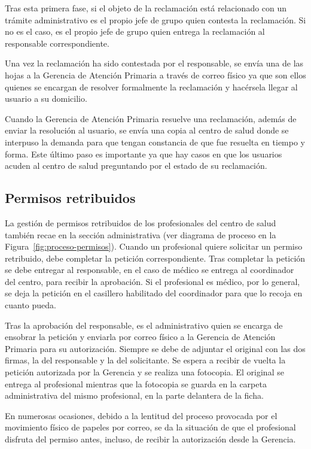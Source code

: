 Tras esta primera fase, si el objeto de la reclamación está relacionado con un trámite administrativo es el propio jefe de grupo quien contesta la reclamación.
Si no es el caso, es el propio jefe de grupo quien entrega la reclamación al responsable correspondiente.

Una vez la reclamación ha sido contestada por el responsable, se envía una de las hojas a la Gerencia de Atención Primaria a través de correo físico ya que son ellos quienes se encargan de resolver formalmente la reclamación y hacérsela llegar al usuario a su domicilio.

Cuando la Gerencia de Atención Primaria resuelve una reclamación, además de enviar la resolución al usuario, se envía una copia al centro de salud donde se interpuso la demanda para que tengan constancia de que fue resuelta en tiempo y forma.
Este último paso es importante ya que hay casos en que los usuarios acuden al centro de salud preguntando por el estado de su reclamación.

\subsection{Permisos retribuidos}

La gestión de permisos retribuidos de los profesionales del centro de salud también recae en la sección administrativa (ver diagrama de proceso en la Figura~\ref{fig:proceso-permisos}).
Cuando un profesional quiere solicitar un permiso retribuido, debe completar la petición correspondiente.
Tras completar la petición se debe entregar al responsable, en el caso de médico se entrega al coordinador del centro, para recibir la aprobación.
Si el profesional es médico, por lo general, se deja la petición en el casillero habilitado del coordinador para que lo recoja en cuanto pueda.

Tras la aprobación del responsable, es el administrativo quien se encarga de ensobrar la petición y enviarla por correo físico a la Gerencia de Atención Primaria para su autorización.
Siempre se debe de adjuntar el original con las dos firmas, la del responsable y la del solicitante.
Se espera a recibir de vuelta la petición autorizada por la Gerencia y se realiza una fotocopia.
El original se entrega al profesional mientras que la fotocopia se guarda en la carpeta administrativa del mismo profesional, en la parte delantera de la ficha.

En numerosas ocasiones, debido a la lentitud del proceso provocada por el movimiento físico de papeles por correo, se da la situación de que el profesional disfruta del permiso antes, incluso, de recibir la autorización desde la Gerencia.

